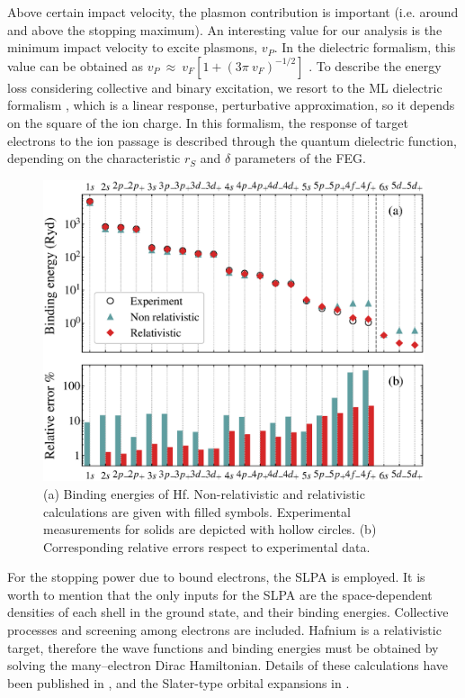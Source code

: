 \documentclass[aps,pra,reprint,groupedaddress]{revtex4-1}
\begin{document}
Above certain impact velocity, the plasmon contribution is important (i.e. around and above the stopping maximum). An interesting value for our analysis is the minimum impact velocity to excite
plasmons, $v_P$. In the dielectric formalism, this value can be obtained as $v_P\ \approx \ v_F[1+(3 \pi\ v_F)^{-1/2} ]$ \cite{suppression}. To describe the energy loss considering collective and binary excitation, we resort to the ML dielectric formalism \cite{Mermin}, which is a linear response, perturbative approximation, so it depends on the square of the ion charge. In this formalism, the response of target electrons to the ion passage is described through the quantum dielectric function, depending on the characteristic $r_S$ and $\delta$ parameters of the FEG. 

\begin{figure}[!t]
\centering
\includegraphics[width=11.cm]{bindener.eps}
\caption{(a) Binding energies of Hf. Non-relativistic and relativistic calculations are given with filled symbols.  Experimental measurements for solids\cite{williams1995} are depicted with hollow circles. (b) Corresponding relative errors respect to experimental data.}
\label{Binding_E}
\end{figure}

For the stopping power due to bound electrons, the SLPA \cite{mon17,mon13} is employed. It is worth to mention that the only inputs for the SLPA are the space-dependent densities of each shell in the ground state, and their binding energies. Collective processes and screening among electrons are included. Hafnium is a relativistic target, therefore the wave functions and binding energies must be obtained by solving the many–electron Dirac Hamiltonian. Details of these calculations have been published in \cite{mendez2019}, and the Slater-type orbital expansions in \cite{Hf_arxiv}.
\end{document}
